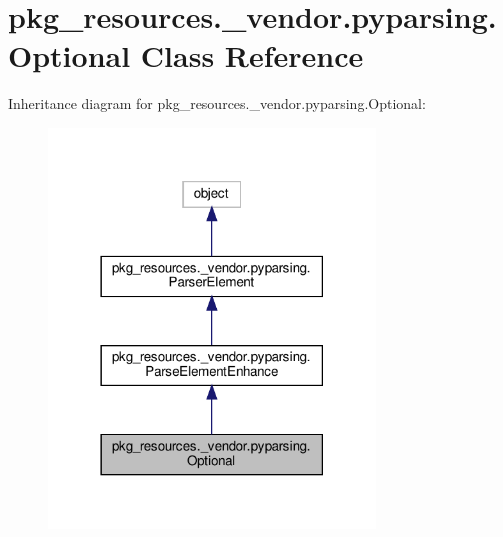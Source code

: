 \hypertarget{classpkg__resources_1_1__vendor_1_1pyparsing_1_1Optional}{}\section{pkg\+\_\+resources.\+\_\+vendor.\+pyparsing.\+Optional Class Reference}
\label{classpkg__resources_1_1__vendor_1_1pyparsing_1_1Optional}


Inheritance diagram for pkg\+\_\+resources.\+\_\+vendor.\+pyparsing.\+Optional\+:
\nopagebreak
\begin{figure}[H]
\begin{center}
\leavevmode
\includegraphics[width=246pt]{classpkg__resources_1_1__vendor_1_1pyparsing_1_1Optional__inherit__graph}
\end{center}
\end{figure}


